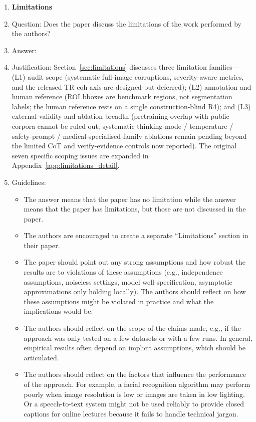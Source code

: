 \begin{enumerate}
\item {\bf Limitations}
    \item[] Question: Does the paper discuss the limitations of the work performed by the authors?
    \item[] Answer: \answerYes{}
    \item[] Justification: Section~\ref{sec:limitations} discusses three limitation families---(L1) audit scope (systematic full-image corruptions, severity-aware metrics, and the released TR-coh axis are designed-but-deferred); (L2) annotation and human reference (ROI bboxes are benchmark regions, not segmentation labels; the human reference rests on a single construction-blind \textsc{R4}); and (L3) external validity and ablation breadth (pretraining-overlap with public corpora cannot be ruled out; systematic thinking-mode / temperature / safety-prompt / medical-specialised-family ablations remain pending beyond the limited CoT and verify-evidence controls now reported). The original seven specific scoping issues are expanded in Appendix~\ref{app:limitations_detail}.
    \item[] Guidelines:
    \begin{itemize}
        \item The answer \answerNA{} means that the paper has no limitation while the answer \answerNo{} means that the paper has limitations, but those are not discussed in the paper.
        \item The authors are encouraged to create a separate ``Limitations'' section in their paper.
        \item The paper should point out any strong assumptions and how robust the results are to violations of these assumptions (e.g., independence assumptions, noiseless settings, model well-specification, asymptotic approximations only holding locally). The authors should reflect on how these assumptions might be violated in practice and what the implications would be.
        \item The authors should reflect on the scope of the claims made, e.g., if the approach was only tested on a few datasets or with a few runs. In general, empirical results often depend on implicit assumptions, which should be articulated.
        \item The authors should reflect on the factors that influence the performance of the approach. For example, a facial recognition algorithm may perform poorly when image resolution is low or images are taken in low lighting. Or a speech-to-text system might not be used reliably to provide closed captions for online lectures because it fails to handle technical jargon.

\end{itemize}
\end{enumerate}
